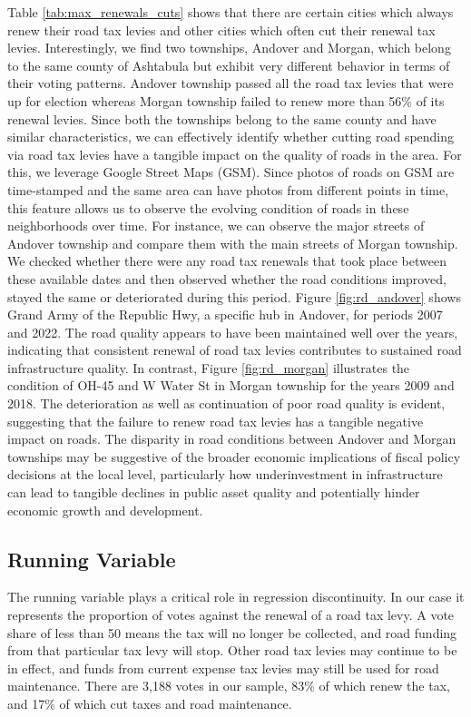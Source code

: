Table \ref{tab:max_renewals_cuts} shows that there are certain cities which always renew their road tax levies and other cities which often cut their renewal tax levies. Interestingly, we find two townships, Andover and Morgan, which belong to the same county of Ashtabula but exhibit very different behavior in terms of their voting patterns. Andover township passed all the road tax levies that were up for election whereas Morgan township failed to renew more than 56\% of its renewal levies. Since both the townships belong to the same county and have similar characteristics, we can effectively identify whether cutting road spending via road tax levies have a tangible impact on the quality of roads in the area. For this, we leverage Google Street Maps (GSM). Since photos of roads on GSM are time-stamped and the same area can have photos from different points in time, this feature allows us to observe the evolving condition of roads in these neighborhoods over time. For instance, we can observe the major streets of Andover township and compare them with the main streets of Morgan township. We checked whether there were any road tax renewals that took place between these available dates and then observed whether the road conditions improved, stayed the same or deteriorated during this period. Figure \ref{fig:rd_andover} shows Grand Army of the Republic Hwy, a specific hub in Andover, for periods 2007 and 2022. The road quality appears to have been maintained well over the years, indicating that consistent renewal of road tax levies contributes to sustained road infrastructure quality. In contrast, Figure \ref{fig:rd_morgan} illustrates the condition of OH-45 and W Water St in Morgan township for the years 2009 and 2018. The deterioration as well as continuation of poor road quality is evident, suggesting that the failure to renew road tax levies has a tangible negative impact on roads. The disparity in road conditions between Andover and Morgan townships may be suggestive of the broader economic implications of fiscal policy decisions at the local level, particularly how underinvestment in infrastructure can lead to tangible declines in public asset quality and potentially hinder economic growth and development.


\subsection{Running Variable}

The running variable plays a critical role in regression discontinuity.  In our case it represents the proportion of votes against the renewal of a road tax levy.  A vote share of less than 50 means the tax will no longer be collected, and road funding from that particular tax levy will stop.  Other road tax levies may continue to be in effect, and funds from current expense tax levies may still be used for road maintenance.  There are 3,188 votes in our sample, 83\% of which renew the tax, and 17\% of which cut taxes and road maintenance.

